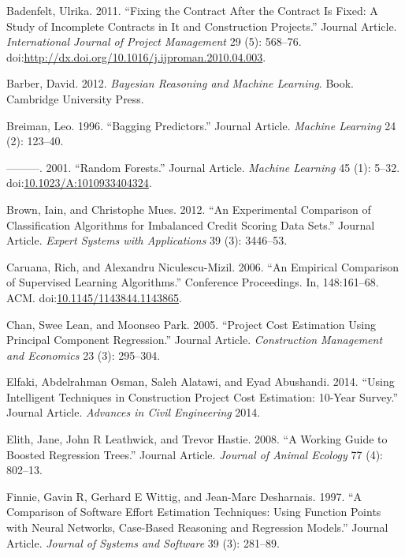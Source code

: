 \documentclass[]{elsarticle} %
\begin{document}
\hypertarget{ref-Badenfelt2011}{}
Badenfelt, Ulrika. 2011. ``Fixing the Contract After the Contract Is
Fixed: A Study of Incomplete Contracts in It and Construction
Projects.'' Journal Article. \emph{International Journal of Project
Management} 29 (5): 568--76.
doi:\href{https://doi.org/http://dx.doi.org/10.1016/j.ijproman.2010.04.003}{http://dx.doi.org/10.1016/j.ijproman.2010.04.003}.

\hypertarget{ref-Barber2012}{}
Barber, David. 2012. \emph{Bayesian Reasoning and Machine Learning}.
Book. Cambridge University Press.

\hypertarget{ref-Breiman1996}{}
Breiman, Leo. 1996. ``Bagging Predictors.'' Journal Article.
\emph{Machine Learning} 24 (2): 123--40.

\hypertarget{ref-Breiman2001a}{}
---------. 2001. ``Random Forests.'' Journal Article. \emph{Machine
Learning} 45 (1): 5--32.
doi:\href{https://doi.org/10.1023/A:1010933404324}{10.1023/A:1010933404324}.

\hypertarget{ref-Brown2012}{}
Brown, Iain, and Christophe Mues. 2012. ``An Experimental Comparison of
Classification Algorithms for Imbalanced Credit Scoring Data Sets.''
Journal Article. \emph{Expert Systems with Applications} 39 (3):
3446--53.

\hypertarget{ref-Caruana2006}{}
Caruana, Rich, and Alexandru Niculescu-Mizil. 2006. ``An Empirical
Comparison of Supervised Learning Algorithms.'' Conference Proceedings.
In, 148:161--68. ACM.
doi:\href{https://doi.org/10.1145/1143844.1143865}{10.1145/1143844.1143865}.

\hypertarget{ref-Chan2005}{}
Chan, Swee Lean, and Moonseo Park. 2005. ``Project Cost Estimation Using
Principal Component Regression.'' Journal Article. \emph{Construction
Management and Economics} 23 (3): 295--304.

\hypertarget{ref-Elfaki2014}{}
Elfaki, Abdelrahman Osman, Saleh Alatawi, and Eyad Abushandi. 2014.
``Using Intelligent Techniques in Construction Project Cost Estimation:
10-Year Survey.'' Journal Article. \emph{Advances in Civil Engineering}
2014.

\hypertarget{ref-Elith2008}{}
Elith, Jane, John R Leathwick, and Trevor Hastie. 2008. ``A Working
Guide to Boosted Regression Trees.'' Journal Article. \emph{Journal of
Animal Ecology} 77 (4): 802--13.

\hypertarget{ref-Finnie1997}{}
Finnie, Gavin R, Gerhard E Wittig, and Jean-Marc Desharnais. 1997. ``A
Comparison of Software Effort Estimation Techniques: Using Function
Points with Neural Networks, Case-Based Reasoning and Regression
Models.'' Journal Article. \emph{Journal of Systems and Software} 39
(3): 281--89.
\end{document}
